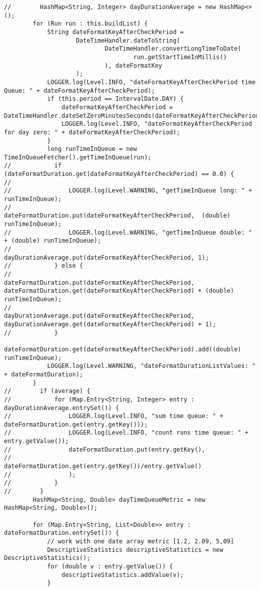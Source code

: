 \begin{lstlisting}
//        HashMap<String, Integer> dayDurationAverage = new HashMap<>();
        for (Run run : this.buildList) {
            String dateFormatKeyAfterCheckPeriod =
                    DateTimeHandler.dateToString(
                            DateTimeHandler.convertLongTimeToDate(
                                    run.getStartTimeInMillis()
                            ), dateFormatKey
                    );
            LOGGER.log(Level.INFO, "dateFormatKeyAfterCheckPeriod time Queue: " + dateFormatKeyAfterCheckPeriod);
            if (this.period == IntervalDate.DAY) {
                dateFormatKeyAfterCheckPeriod = DateTimeHandler.dateSetZeroMinutesSeconds(dateFormatKeyAfterCheckPeriod);
                LOGGER.log(Level.INFO, "dateFormatKeyAfterCheckPeriod for day zero: " + dateFormatKeyAfterCheckPeriod);
            }
            long runTimeInQueue = new TimeInQueueFetcher().getTimeInQueue(run);
//            if (dateFormatDuration.get(dateFormatKeyAfterCheckPeriod) == 0.0) {
//
//                LOGGER.log(Level.WARNING, "getTimeInQueue long: " + runTimeInQueue);
//                dateFormatDuration.put(dateFormatKeyAfterCheckPeriod,  (double) runTimeInQueue);
//                LOGGER.log(Level.WARNING, "getTimeInQueue double: " + (double) runTimeInQueue);
//                dayDurationAverage.put(dateFormatKeyAfterCheckPeriod, 1);
//            } else {
//                dateFormatDuration.put(dateFormatKeyAfterCheckPeriod, dateFormatDuration.get(dateFormatKeyAfterCheckPeriod) + (double) runTimeInQueue);
//                dayDurationAverage.put(dateFormatKeyAfterCheckPeriod, dayDurationAverage.get(dateFormatKeyAfterCheckPeriod) + 1);
//            }
            dateFormatDuration.get(dateFormatKeyAfterCheckPeriod).add((double) runTimeInQueue);
            LOGGER.log(Level.WARNING, "dateFormatDurationListValues: " + dateFormatDuration);
        }
//        if (average) {
//            for (Map.Entry<String, Integer> entry : dayDurationAverage.entrySet()) {
//                LOGGER.log(Level.INFO, "sum time queue: " + dateFormatDuration.get(entry.getKey()));
//                LOGGER.log(Level.INFO, "count runs time queue: " + entry.getValue());
//                dateFormatDuration.put(entry.getKey(),
//                        dateFormatDuration.get(entry.getKey())/entry.getValue()
//                );
//            }
//        }
        HashMap<String, Double> dayTimeQueueMetric = new HashMap<String, Double>();

        for (Map.Entry<String, List<Double>> entry : dateFormatDuration.entrySet()) {
            // work with one date array metric [1.2, 2.09, 5,09]
            DescriptiveStatistics descriptiveStatistics = new DescriptiveStatistics();
            for (double v : entry.getValue()) {
                descriptiveStatistics.addValue(v);
            }


\end{lstlisting}
